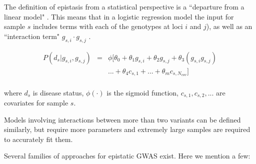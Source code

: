 %


The definition of epistasis from a statistical perspective is a ``departure from a linear model" \cite{cordell2009detecting}. This means that in a logistic regression model the input for sample $s$ includes terms with each of the genotypes at loci $i$ and $j$), as well as an ``interaction term" $g_{s,i} \cdot g_{s,j}$ \cite{cordell2002epistasis}. 

\begin{eqnarray*} \label{eq:gwasLogRegH1}
    P( d_s | g_{s,i},g_{s,j}) & = & \phi[ \theta_0 + \theta_1 g_{s,i} + \theta_2 g_{s,j} + \theta_3 (g_{s,i} g_{s,j}) \\
    & & ... + \theta_4 c_{s,1} + ... + \theta_m c_{s,N_{cov}} ] \\
\end{eqnarray*}

where $d_s$ is disease status, $\phi(\cdot)$ is the sigmoid function, $c_{s,1}, c_{s,2}, ... $ are covariates for sample $s$.

Models involving interactions between more than two variants can be defined similarly, but require more parameters and extremely large samples are required to accurately fit them.

Several families of approaches for epistatic GWAS exist. Here we mention a few:

